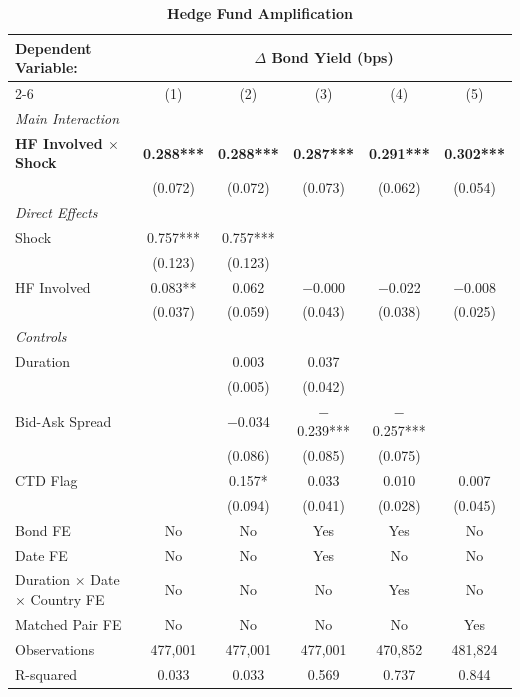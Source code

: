 \documentclass[english, 11pt, oneside]{article}
\begin{document}
\begin{table}[t]
\centering
\caption{\textbf{Hedge Fund Amplification}}
\footnotesize
\setlength{\tabcolsep}{9pt}
\renewcommand{\arraystretch}{1.1}
\begin{tabular}{l c c c c c}
\toprule
\textbf{Dependent Variable:} & \multicolumn{5}{c}{\textbf{$\Delta$ Bond Yield (bps)}} \\
\cmidrule(lr){2-6}
 & (1) & (2) & (3) & (4) & (5) \\
\midrule
\textit{Main Interaction} & & & & & \\
\textbf{HF Involved $\times$ Shock} & \textbf{0.288***} & \textbf{0.288***} & \textbf{0.287***} & \textbf{0.291***} & \textbf{0.302***} \\
 & (0.072) & (0.072) & (0.073) & (0.062) & (0.054) \\
\addlinespace
\textit{Direct Effects} & & & & & \\
Shock & 0.757*** & 0.757*** &  &  &  \\
 & (0.123) & (0.123) &  &  &  \\
HF Involved & 0.083** & 0.062 & $-$0.000 & $-$0.022 & $-$0.008 \\
 & (0.037) & (0.059) & (0.043) & (0.038) & (0.025) \\
\addlinespace
\textit{Controls} & & & & & \\
Duration & & 0.003 & 0.037 &  &  \\
 & & (0.005) & (0.042) &  &  \\
Bid-Ask Spread & & $-$0.034 & $-$0.239*** & $-$0.257*** &  \\
 & & (0.086) & (0.085) & (0.075) &  \\
CTD Flag & & 0.157* & 0.033 & 0.010 & 0.007 \\
 & & (0.094) & (0.041) & (0.028) & (0.045) \\
\midrule
Bond FE & No & No & Yes & Yes & No \\
Date FE & No & No & Yes & No & No \\
Duration $\times$ Date $\times$ Country FE & No & No & No & Yes & No \\
Matched Pair FE & No & No & No & No & Yes \\
\midrule
Observations & 477,001 & 477,001 & 477,001 & 470,852 & 481,824 \\
R-squared & 0.033 & 0.033 & 0.569 & 0.737 & 0.844 \\
\bottomrule
\end{tabular}
\label{tab:baseline}


\end{table}
\end{document}

